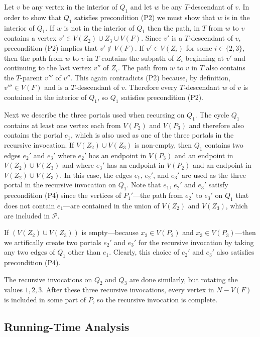 \documentclass[kpfonts]{patmorin}
\begin{document}
Let $v$ be any vertex in the interior of $Q_1$ and let $w$ be any $T$-descendant of $v$.  In order to show that $Q_1$ satisfies precondition (P2) we must show that $w$ is in the interior of $Q_1$.  If $w$ is not in the interior of $Q_1$ then the path, in $T$ from $w$ to $v$ contains a vertex $v'\in V(Z_2)\cup Z_3\cup V(F)$.  Since $v'$ is a $T$-descendant of $v$, precondition (P2) implies that $v'\not\in V(F)$.  If $v'\in V(Z_i)$ for some $i\in\{2,3\}$, then the path from $w$ to $v$ in $T$ contains the subpath of $Z_i$ beginning at $v'$ and continuing to the last vertex $v''$ of $Z_i$.  The path from $w$ to $v$ in $T$ also contains the $T$-parent $v'''$ of $v''$.  This again contradicts (P2) because, by definition, $v'''\in V(F)$ and is a $T$-descendant of $v$.  Therefore every $T$-descendant $w$ of $v$ is contained in the interior of $Q_1$, so $Q_1$ satisfies precondition (P2).

Next we describe the three portals used when recursing on $Q_1$.
The cycle $Q_1$ contains at least one vertex each from $V(P_2)$ and $V(P_3)$ and therefore also contains the portal $e_1$, which is also used as one of the three portals in the recursive invocation.  If $V(Z_2)\cup V(Z_3)$ is non-empty, then $Q_1$ contains two edges $e_2'$ and $e_3'$ where $e_2'$ has an endpoint in $V(P_3)$ and an endpoint in $V(Z_2)\cup V(Z_3)$ and where $e_3'$ has an endpoint in $V(P_2)$ and an endpoint in $V(Z_2)\cup V(Z_3)$.  In this case, the edges $e_1$, $e_2'$, and $e_3'$ are used as the three portal in the recursive invocation on $Q_1$.  Note that $e_1$, $e_2'$ and $e_3'$ satisfy precondition (P4) since the vertices of $P_1'$---the path from $e_2'$ to $e_3'$ on $Q_1$ that does not contain $e_1$---are contained in the union of $V(Z_2)$ and $V(Z_3)$, which are included in $\mathcal{P}$.

If $(V(Z_2)\cup V(Z_3))$ is empty---because $x_2\in V(P_2)$ and $x_3\in V(P_3)$---then we artifically create two portals $e_2'$ and $e_3'$ for the recursive invocation by taking any two edges of $Q_1$ other than $e_1$. Clearly, this choice of $e_2'$ and $e_3'$ also satisfies precondition (P4).

The recursive invocations on $Q_2$ and $Q_3$ are done similarly, but rotating the values $1,2,3$.  After these three recursive invocations, every vertex in $N-V(F)$ is included in some part of $P$, so the recursive invocation is complete.

\subsection{Running-Time Analysis}
\end{document}
